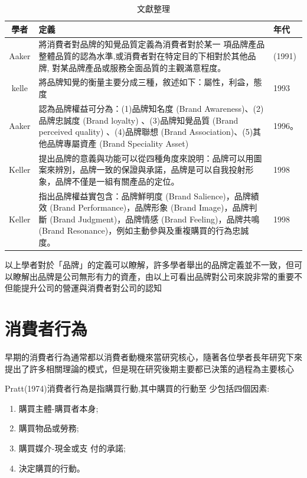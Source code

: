 \begin{table}[htb]
\caption{文獻整理}
\label{tab:PL2}
\centering
%
\begin{tabular}[t]{|c|p{8.5cm}|p{2.5cm}|} %
\hline
學者&定義 & 年代 \tabularnewline
\hline
Aaker & 將消費者對品牌的知覺品質定義為消費者對於某一 項品牌產品整體品質的認為水準,或消費者對在特定目的下相對於其他品牌, 對某品牌產品或服務全面品質的主觀滿意程度。& (1991)  \tabularnewline
\hline
kelle&將品牌知覺的衡量主要分成三種，敘述如下：屬性，利益，態度& 1993 \tabularnewline
\hline
Aaker&認為品牌權益可分為：(1)品牌知名度 (Brand Awareness)、(2)品牌忠誠度 (Brand loyalty) 、(3)品牌知覺品質 (Brand perceived quality) 、(4)品牌聯想 (Brand Association)、(5)其他品牌專屬資產 (Brand Speciality Asset) &1996。\tabularnewline
\hline
Keller&提出品牌的意義與功能可以從四種角度來說明：品牌可以用圖案來辨別，品牌一致的保證與承諾，品牌是可以自我投射形象，品牌不僅是一組有關產品的定位。&1998 \tabularnewline
\hline
Keller&指出品牌權益實包含：品牌鮮明度 (Brand Salience)，品牌績效 (Brand Performance)，品牌形象 (Brand Image)，品牌判斷 (Brand Judgment)，品牌情感 (Brand Feeling)，品牌共鳴 (Brand Resonance)，例如主動參與及重複購買的行為忠誠度。&1998 \tabularnewline
\hline
\end{tabular}
\end{table}

以上學者對於「品牌」的定義可以瞭解，許多學者舉出的品牌定義並不一致，但可以瞭解出品牌是公司無形有力的資產，由以上可看出品牌對公司來說非常的重要不但能提升公司的營運與消費者對公司的認知

\section{消費者行為}
早期的消費者行為通常都以消費者動機來當研究核心，隨著各位學者長年研究下來提出了許多相關理論的模式，但是現在研究後期主要都已決策的過程為主要核心

Pratt(1974)\cite{Pratt1974}消費者行為是指購買行動,其中購買的行動至 少包括四個因素:
\begin{enumerate}
\item 購買主體-購買者本身; 
\item  購買物品或勞務;
\item  購買媒介-現金或支 付的承諾;
\item  決定購買的行動。
\end{enumerate}

